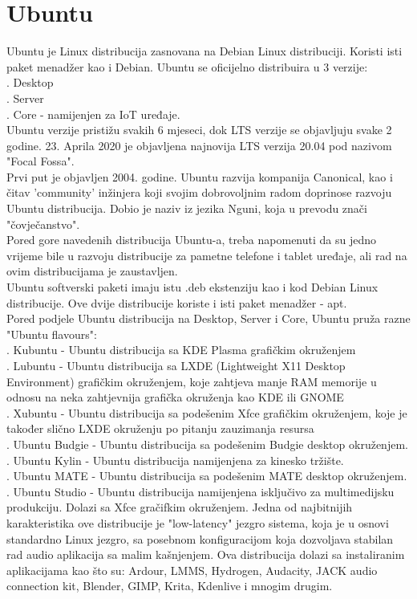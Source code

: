 \documentclass[12pt,vi]{mitthesis}
\begin{document}
\section*{Ubuntu}
Ubuntu\cite{ubuntu-wiki} je Linux distribucija zasnovana na Debian Linux distribuciji. Koristi isti paket menadžer kao i Debian. Ubuntu se oficijelno distribuira u 3 verzije:\\
. Desktop\\
. Server\\
. Core - namijenjen za IoT uređaje.\\
\indent
Ubuntu verzije pristižu svakih 6 mjeseci, dok LTS verzije se objavljuju svake 2 godine. 23. Aprila 2020 je objavljena najnovija LTS verzija 20.04 pod nazivom "Focal Fossa".\\
\indent
Prvi put je objavljen 2004. godine. Ubuntu razvija kompanija Canonical, kao i čitav 'community' inžinjera koji svojim dobrovoljnim radom doprinose razvoju Ubuntu distribucija. Dobio je naziv iz jezika Nguni, koja u prevodu znači "čovječanstvo".\\
Pored gore navedenih distribucija Ubuntu-a, treba napomenuti da su jedno vrijeme bile u razvoju distribucije za pametne telefone i tablet uređaje, ali rad na ovim distribucijama je zaustavljen.\\
\indent
Ubuntu softverski paketi imaju istu .deb ekstenziju kao i kod Debian Linux distribucije. Ove dvije distribucije koriste i isti paket menadžer - apt.\\
\indent
Pored podjele Ubuntu distribucija na Desktop, Server i Core, Ubuntu pruža razne "Ubuntu flavours":\\
. Kubuntu - Ubuntu distribucija sa KDE Plasma grafičkim okruženjem\\
. Lubuntu - Ubuntu distribucija sa LXDE (Lightweight X11 Desktop Environment) grafičkim okruženjem, koje zahtjeva manje RAM memorije u odnosu na neka zahtjevnija grafička okruženja kao KDE ili GNOME\\
. Xubuntu - Ubuntu distribucija sa podešenim Xfce grafičkim okruženjem, koje je također slično LXDE okruženju po pitanju zauzimanja resursa\\
. Ubuntu Budgie - Ubuntu distribucija sa podešenim Budgie desktop okruženjem.\\
. Ubuntu Kylin - Ubuntu distribucija namijenjena za kinesko tržište.\\
. Ubuntu MATE - Ubuntu distribucija sa podešenim MATE desktop okruženjem.\\
. Ubuntu Studio - Ubuntu distribucija namijenjena isključivo za multimedijsku produkciju. Dolazi sa Xfce gračifkim okruženjem. Jedna od najbitnijih karakteristika ove distribucije je "low-latency" jezgro sistema, koja je u osnovi standardno Linux jezgro, sa posebnom konfiguracijom koja dozvoljava stabilan rad audio aplikacija sa malim kašnjenjem. Ova distribucija dolazi sa instaliranim aplikacijama kao što su: Ardour, LMMS, Hydrogen, Audacity, JACK audio connection kit, Blender, GIMP, Krita, Kdenlive i mnogim drugim.
\end{document}
